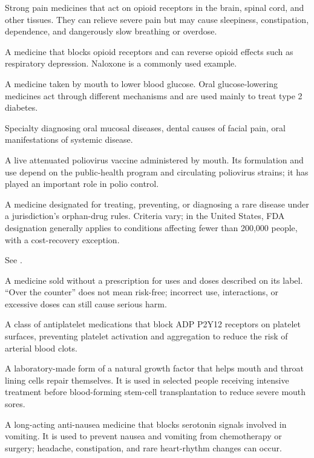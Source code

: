  Strong pain medicines that act on opioid receptors in the brain, spinal cord, and other tissues. They can relieve severe pain but may cause sleepiness, constipation, dependence, and dangerously slow breathing or overdose.

 A medicine that blocks opioid receptors and can reverse opioid effects such as respiratory depression.
Naloxone is a commonly used example.

 A medicine taken by mouth to lower blood glucose. Oral glucose-lowering medicines act through different mechanisms and are used mainly to treat type 2 diabetes.

 Specialty diagnosing oral mucosal diseases, dental causes of facial pain, oral
manifestations of systemic disease.

 A live attenuated poliovirus vaccine administered by mouth. Its formulation and use
depend on the public-health program and circulating poliovirus strains; it has played an important role in polio control.


 A medicine designated for treating, preventing, or diagnosing a rare disease under a jurisdiction’s orphan-drug rules. Criteria vary; in the United States, FDA designation generally applies to conditions affecting fewer than 200,000 people, with a cost-recovery exception.

 See .

 A medicine sold without a prescription for uses and doses described on its label. “Over the counter” does not mean risk-free; incorrect use, interactions, or excessive doses can still cause serious harm.

 A class of antiplatelet medications that block ADP P2Y12 receptors on platelet surfaces, preventing platelet activation and aggregation to reduce the risk of arterial blood clots.

 A laboratory-made form of a natural growth factor that helps mouth and throat lining cells repair themselves. It is used in selected people receiving intensive treatment before blood-forming stem-cell transplantation to reduce severe mouth sores.

 A long-acting anti-nausea medicine that blocks serotonin signals involved in vomiting. It is used to prevent nausea and vomiting from chemotherapy or surgery; headache, constipation, and rare heart-rhythm changes can occur.

